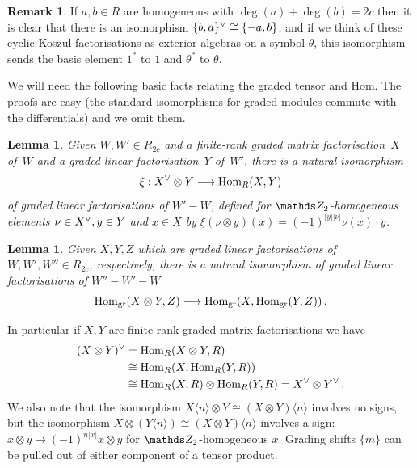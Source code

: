 \documentclass{compositio}
\newtheorem{lemma}[theorem]{Lemma}
\theoremstyle{definition}
\newtheorem{remark}[theorem]{Remark}
\numberwithin{equation}{section}
\def\Hom{\operatorname{Hom}}
\begin{document}
\begin{remark}\label{remark:dual_koszul_cyclic} If $a,b \in R$ are homogeneous with $\deg(a) + \deg(b) = 2c$ then it is clear that there is an isomorphism $\{ b, a \}^{\vee} \cong \{-a, b\}$, and if we think of these cyclic Koszul factorisations as exterior algebras on a symbol $\theta$, this isomorphism sends the basis element $1^*$ to $1$ and $\theta^*$ to $\theta$.
\end{remark}

We will need the following basic facts relating the graded tensor and Hom. The proofs are easy (the standard isomorphisms for graded modules commute with the differentials) and we omit them.

\begin{lemma}\label{lemma:homdual} Given $W, W' \in R_{2c}$ and a finite-rank graded matrix factorisation~$X$ of~$W$ and a graded linear factorisation~$Y$ of~$W'$, there is a natural isomorphism
\[
\xi: X\mdual \otimes Y \lto \Hom_R(X,Y)
\]
of graded linear factorisations of $W' - W$, defined for $\Ztwo$-homogeneous elements $\nu \in X^{\vee}, y \in Y$ and $x \in X$ by $\xi( \nu \otimes y )(x) = (-1)^{|y||\nu|} \nu(x) \cdot y$.
\end{lemma}

\begin{lemma} Given $X,Y,Z$ which are graded linear factorisations of $W, W', W'' \in R_{2c}$, respectively, there is a natural isomorphism of graded linear factorisations of $W'' - W' - W$
\[
\Hom_{\text{gr}}(X \otimes Y, Z) \lto \Hom_{\text{gr}}(X, \Hom_{\text{gr}}(Y,Z)) \, .
\]
\end{lemma}

In particular if $X, Y$ are finite-rank graded matrix factorisations we have
\begin{align}
(X \otimes Y)\mdual &= \Hom_R(X \otimes Y, R) \nonumber \\
&\cong \Hom_R(X, \Hom_R(Y,R)) \nonumber \\
&\cong \Hom_R(X,R) \otimes \Hom_R(Y,R) = X\mdual \otimes Y\mdual \, . \label{eq:dual_tensor}
\end{align}
We also note that the isomorphism $X\langle n \rangle \otimes Y \cong (X \otimes Y)\langle n \rangle$ involves no signs, but the isomorphism $X \otimes (Y \langle n \rangle) \cong (X \otimes Y)\langle n \rangle$ involves a sign: $x \otimes y \longmapsto (-1)^{n|x|} x \otimes y$ for $\Ztwo$-homogeneous $x$. Grading shifts $\{ m \}$ can be pulled out of either component of a tensor product.
\\
\end{document}
